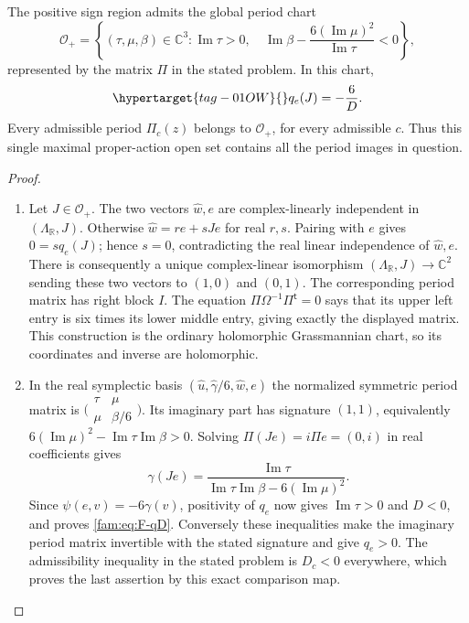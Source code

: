\begin{proposition}\hypertarget{tag-01RD}{}\label{fam:src:F.2.3}\label{fam:st:F.2.3}

The positive sign region admits the global period chart
\[
 \mathcal O_+=\left\{
 (\tau,\mu,\beta)\in\mathbb C^3:
 \operatorname{Im}\tau>0,\quad
 \operatorname{Im}\beta-\frac{6(\operatorname{Im}\mu)^2}
 {\operatorname{Im}\tau}<0\right\},
\]
represented by the matrix $\Pi$ in the stated problem.  In this chart,
\begin{equation}\hypertarget{tag-01OW}{}\label{fam:eq:F-qD}
 q_e(J)=-\frac6D.
\end{equation}
Every admissible period $\Pi_c(z)$ belongs to $\mathcal O_+$, for every
admissible $c$.  Thus this single maximal proper-action open set contains
all the period images in question.
\end{proposition}



\begin{proof}
\begin{enumerate}[label=\arabic*.,leftmargin=*]
\item Let $J\in\mathcal O_+$.  The two vectors $\widehat w,e$ are complex-linearly
independent in $(\Lambda_{\mathbb R},J)$.  Otherwise
$\widehat w=r e+sJe$ for real $r,s$.  Pairing with $e$ gives
$0=sq_e(J)$; hence $s=0$, contradicting the real linear independence
of $\widehat w,e$.  There is consequently a unique complex-linear
isomorphism $(\Lambda_{\mathbb R},J)\to\mathbb C^2$ sending these two
vectors to $(1,0)$ and $(0,1)$.  The corresponding period matrix has
right block $I$.  The equation
$\Pi\Omega^{-1}\Pi^{\mathsf t}=0$ says that its upper left entry is
six times its lower middle entry, giving exactly the displayed matrix.
This construction is the ordinary holomorphic Grassmannian chart,
so its coordinates and inverse are holomorphic.

\item In the real symplectic basis
$(\widehat u,\widehat\gamma/6,\widehat w,e)$ the normalized symmetric
period matrix is
$\bigl(\begin{smallmatrix}\tau&\mu\\\mu&\beta/6\end{smallmatrix}\bigr)$.
Its imaginary part has signature $(1,1)$, equivalently
$6(\operatorname{Im}\mu)^2-
\operatorname{Im}\tau\operatorname{Im}\beta>0$.
Solving $\Pi(Je)=i\Pi e=(0,i)$ in real coefficients gives
\[
 \gamma(Je)=
 \frac{\operatorname{Im}\tau}
 {\operatorname{Im}\tau\operatorname{Im}\beta-
 6(\operatorname{Im}\mu)^2}.
\]
Since $\psi(e,v)=-6\gamma(v)$, positivity of $q_e$ now gives
$\operatorname{Im}\tau>0$ and $D<0$, and proves \eqref{fam:eq:F-qD}.
Conversely these inequalities make the imaginary period matrix
invertible with the stated signature and give $q_e>0$.  The admissibility
inequality in the stated problem is $D_c<0$ everywhere, which proves the last
assertion by this exact comparison map.
\end{enumerate}
\end{proof}

